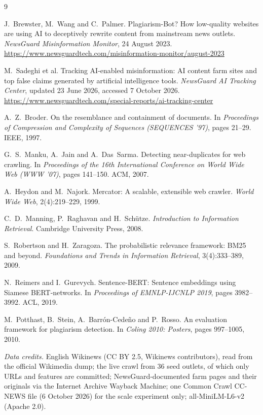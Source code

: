 \documentclass[11pt,a4paper]{article}
\begin{document}
\clearpage
\renewcommand{\refname}{References}
\begin{thebibliography}{9}
\small
\setlength{\itemsep}{0.2em}

 J.~Brewster, M.~Wang and C.~Palmer. Plagiarism-Bot? How low-quality websites are using AI to deceptively rewrite content from mainstream news outlets. \textit{NewsGuard Misinformation Monitor}, 24 August 2023. \url{https://www.newsguardtech.com/misinformation-monitor/august-2023}

 M.~Sadeghi et al. Tracking AI-enabled misinformation: AI content farm sites and top false claims generated by artificial intelligence tools. \textit{NewsGuard AI Tracking Center}, updated 23 June 2026, accessed 7 October 2026. \url{https://www.newsguardtech.com/special-reports/ai-tracking-center}

 A.~Z.~Broder. On the resemblance and containment of documents. In \textit{Proceedings of Compression and Complexity of Sequences (SEQUENCES '97)}, pages 21--29. IEEE, 1997.

 G.~S.~Manku, A.~Jain and A.~Das~Sarma. Detecting near-duplicates for web crawling. In \textit{Proceedings of the 16th International Conference on World Wide Web (WWW '07)}, pages 141--150. ACM, 2007.

 A.~Heydon and M.~Najork. Mercator: A scalable, extensible web crawler. \textit{World Wide Web}, 2(4):219--229, 1999.

 C.~D.~Manning, P.~Raghavan and H.~Sch\"utze. \textit{Introduction to Information Retrieval}. Cambridge University Press, 2008.

 S.~Robertson and H.~Zaragoza. The probabilistic relevance framework: BM25 and beyond. \textit{Foundations and Trends in Information Retrieval}, 3(4):333--389, 2009.

 N.~Reimers and I.~Gurevych. Sentence-BERT: Sentence embeddings using Siamese BERT-networks. In \textit{Proceedings of EMNLP-IJCNLP 2019}, pages 3982--3992. ACL, 2019.

 M.~Potthast, B.~Stein, A.~Barr\'on-Cede\~no and P.~Rosso. An evaluation framework for plagiarism detection. In \textit{Coling 2010: Posters}, pages 997--1005, 2010.

\end{thebibliography}

{\small
\textit{Data credits.} English Wikinews (CC BY 2.5, Wikinews contributors), read from the official Wikimedia dump; the live crawl from 36 seed outlets, of which only URLs and features are committed; NewsGuard-documented farm pages and their originals via the Internet Archive Wayback Machine; one Common Crawl CC-NEWS file (6 October 2026) for the scale experiment only; all-MiniLM-L6-v2 (Apache 2.0).\par}
\end{document}
